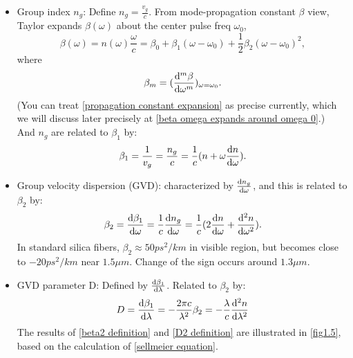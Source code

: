 \documentclass[12pt]{extarticle}
\numberwithin{equation}{section}
\numberwithin{figure}{section}
\numberwithin{table}{section}
\newcommand{\<}{\langle}
\renewcommand{\>}{\rangle}
\theoremstyle{definition}
\begin{document}
\begin{itemize}
                \item Group index $n_g$: Define $n_g = \frac{v_g}{c}$. From mode-propagation constant $\beta$ view, Taylor expands $\beta(\omega)$ about the center pulse freq $\omega_0$, 
                    \begin{equation}
                        \beta(\omega) = n(\omega)\frac{\omega}{c}=\beta_0 + \beta_1(\omega-\omega_0)+\frac{1}{2}\beta_2(\omega-\omega_0)^2,
                        \label{propagation constant expansion}
                    \end{equation}
                    where
                    \begin{equation}
                        \beta_m = (\dv[m]{\beta}{\omega})_{\omega=\omega_0}.
                        \label{betam definition}
                    \end{equation}
                    (You can treat \autoref{propagation constant expansion} as precise currently, which we will discuss later precisely at \autoref{beta omega expands around omega 0}.)\\
                    And $n_g$ are related to $\beta_1$ by:
                    \begin{equation}
                        \beta_1 = \frac{1}{v_g} = \frac{n_g}{c} = \frac{1}{c}(n+\omega \dv{n}{\omega}).
                        \label{group velocity and group index}
                    \end{equation}
                
                \item Group velocity dispersion (GVD): characterized by $\dv{n_g}{\omega}$, and this is related to $\beta_2$ by:
                    \begin{equation}
                        \beta_2 = \dv{\beta_1}{\omega} = \frac{1}{c}\dv{n_g}{\omega} = \frac{1}{c}(2\dv{n}{\omega} +\dv[2]{n}{\omega}).
                        \label{beta2 definition}
                    \end{equation}
                    In standard silica fibers, $\beta_2\approx50ps^2/km$ in visible region, but becomes close to $-20ps^2/km$ near $1.5\mu m$. Change of the sign occurs around $1.3\mu m$.
                \item GVD parameter D: Defined by $\dv{\beta_1}{\lambda}$. Related to $\beta_2$ by:
                    \begin{equation}
                        D = \dv{\beta_1}{\lambda} = -\frac{2\pi c}{\lambda^2}\beta_2 = -\frac{\lambda}{c}\dv[2]{n}{\lambda}
                        \label{D2 definition}
                    \end{equation}
                     The results of \autoref{beta2 definition} and \autoref{D2 definition} are illustrated in \autoref{fig1.5}, based on the calculation of \autoref{sellmeier equation}.
                     

\end{itemize}
\end{document}
